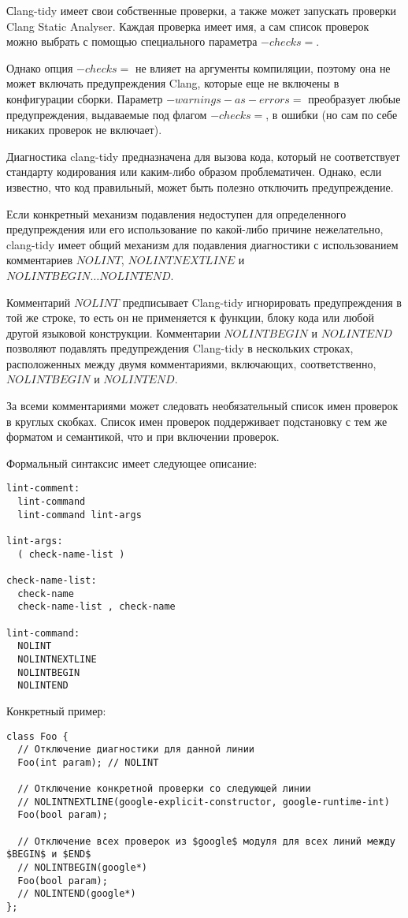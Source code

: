 \documentclass{mipt-thesis-bs}
\begin{document}
Сlang-tidy имеет свои собственные проверки, а также может запускать 
проверки Clang Static Analyser. Каждая проверка имеет имя, 
а сам список проверок можно выбрать с помощью специального параметра $-checks=$.

Однако опция $-checks=$ не влияет на аргументы компиляции, поэтому она 
не может включать предупреждения Clang, которые еще не включены в 
конфигурации сборки. Параметр $-warnings-as-errors=$ преобразует 
любые предупреждения, выдаваемые под флагом $-checks=$, в ошибки 
(но сам по себе никаких проверок не включает).

Диагностика clang-tidy предназначена для вызова кода, который не 
соответствует стандарту кодирования или каким-либо образом проблематичен. 
Однако, если известно, что код правильный, может быть полезно отключить предупреждение.

Если конкретный механизм подавления недоступен для определенного 
предупреждения или его использование по какой-либо причине 
нежелательно, clang-tidy имеет общий механизм для подавления 
диагностики с использованием комментариев $NOLINT$, $NOLINTNEXTLINE$ и $NOLINTBEGIN… NOLINTEND$.

Комментарий $NOLINT$ предписывает Clang-tidy игнорировать предупреждения 
в той же строке, то есть он не применяется к функции, блоку кода или любой 
другой языковой конструкции.
Комментарии $NOLINTBEGIN$ и $NOLINTEND$ позволяют подавлять предупреждения 
Clang-tidy в нескольких строках, расположенных между двумя 
комментариями, включающих, соответственно, $NOLINTBEGIN$ и $NOLINTEND$.

За всеми комментариями может следовать необязательный список имен 
проверок в круглых скобках. 
Список имен проверок поддерживает подстановку с тем же форматом 
и семантикой, что и при включении проверок.

Формальный синтаксис имеет следующее описание:
\begin{verbatim}
lint-comment:
  lint-command
  lint-command lint-args

lint-args:
  ( check-name-list )

check-name-list:
  check-name
  check-name-list , check-name

lint-command:
  NOLINT
  NOLINTNEXTLINE
  NOLINTBEGIN
  NOLINTEND
\end{verbatim}

Конкретный пример:
\begin{verbatim}
class Foo {
  // Отключение диагностики для данной линии
  Foo(int param); // NOLINT

  // Отключение конкретной проверки со следующей линии
  // NOLINTNEXTLINE(google-explicit-constructor, google-runtime-int)
  Foo(bool param);

  // Отключение всех проверок из $google$ модуля для всех линий между $BEGIN$ и $END$
  // NOLINTBEGIN(google*)
  Foo(bool param);
  // NOLINTEND(google*)
};
\end{verbatim}
\end{document}

